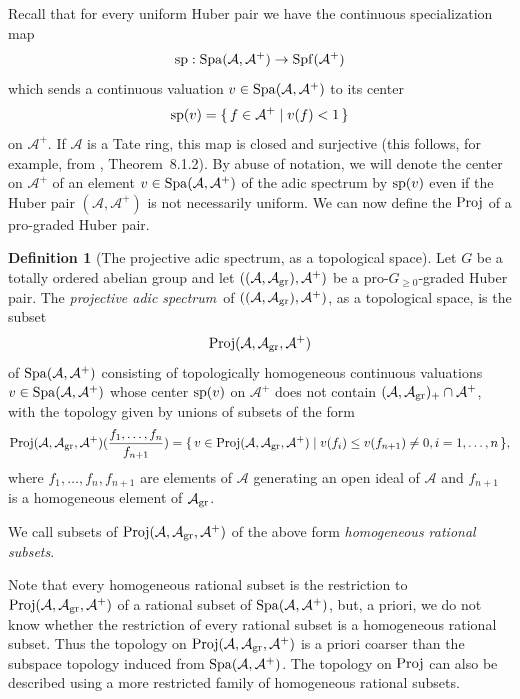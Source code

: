 \documentclass[12pt,twoside,a4paper]{article}
\theoremstyle{definition}
\newtheorem{mydef}[thm]{Definition}
\theoremstyle{remark}
\newcommand\gr{{\rm gr}}
\newcommand\Proj{{\rm Proj}}
\newcommand\spc{{\rm sp}}
\newcommand\Spa{{\rm Spa}}
\newcommand\Spf{{\rm Spf}}
\begin{document}
Recall that for every uniform Huber pair we have the continuous specialization map \begin{equation*}\spc: \Spa(\mathcal{A}, \mathcal{A}^{+})\to \Spf(\mathcal{A}^{+})\end{equation*}which sends a continuous valuation $v\in \Spa(\mathcal{A}, \mathcal{A}^{+})$ to its center \begin{equation*}\spc(v)=\{\, f\in \mathcal{A}^{+}\mid v(f)<1\,\}\end{equation*}on $\mathcal{A}^{+}$. If $\mathcal{A}$ is a Tate ring, this map is closed and surjective (this follows, for example, from \cite{BhattNotes}, Theorem~8.1.2). By abuse of notation, we will denote the center on $\mathcal{A}^{+}$ of an element $v\in \Spa(\mathcal{A}, \mathcal{A}^{+})$ of the adic spectrum by $\spc(v)$ even if the Huber pair $(\mathcal{A}, \mathcal{A}^{+})$ is not necessarily uniform. We can now define the $\Proj$ of a pro-graded Huber pair. 
\begin{mydef}[The projective adic spectrum, as a topological space]\label{Adic Proj, part 1}Let $G$ be a totally ordered abelian group and let $((\mathcal{A}, \mathcal{A}_{\gr}), \mathcal{A}^{+})$ be a pro-$G_{\geq0}$-graded Huber pair. The \textit{projective adic spectrum} of $((\mathcal{A}, \mathcal{A}_{\gr}), \mathcal{A}^{+})$, as a topological space, is the subset \begin{equation*}\Proj(\mathcal{A}, \mathcal{A}_{\gr}, \mathcal{A}^{+})\end{equation*}of $\Spa(\mathcal{A}, \mathcal{A}^{+})$ consisting of topologically homogeneous continuous valuations $v\in \Spa(\mathcal{A}, \mathcal{A}^{+})$ whose center $\spc(v)$ on $\mathcal{A}^{+}$ does not contain $(\mathcal{A}, \mathcal{A}_{\gr})_{+}\cap \mathcal{A}^{+}$, with the topology given by unions of subsets of the form \begin{equation*}\Proj(\mathcal{A}, \mathcal{A}_{\gr}, \mathcal{A}^{+})(\frac{f_1,\dots, f_n}{f_{n+1}})=\{\, v\in \Proj(\mathcal{A}, \mathcal{A}_{\gr}, \mathcal{A}^{+})\mid v(f_{i})\leq v(f_{n+1})\neq 0, i=1,\dots, n\,\},\end{equation*}where $f_1,\dots, f_{n}, f_{n+1}$ are elements of $\mathcal{A}$ generating an open ideal of $\mathcal{A}$ and $f_{n+1}$ is a homogeneous element of $\mathcal{A}_{\gr}$. 

We call subsets of $\Proj(\mathcal{A}, \mathcal{A}_{\gr}, \mathcal{A}^{+})$ of the above form \textit{homogeneous rational subsets}. \end{mydef}
Note that every homogeneous rational subset is the restriction to $\Proj(\mathcal{A}, \mathcal{A}_{\gr}, \mathcal{A}^{+})$ of a rational subset of $\Spa(\mathcal{A}, \mathcal{A}^{+})$, but, a priori, we do not know whether the restriction of every rational subset is a homogeneous rational subset. Thus the topology on $\Proj(\mathcal{A}, \mathcal{A}_{\gr}, \mathcal{A}^{+})$ is a priori coarser than the subspace topology induced from $\Spa(\mathcal{A}, \mathcal{A}^{+})$. The topology on $\Proj$ can also be described using a more restricted family of homogeneous rational subsets. 
\end{document}
